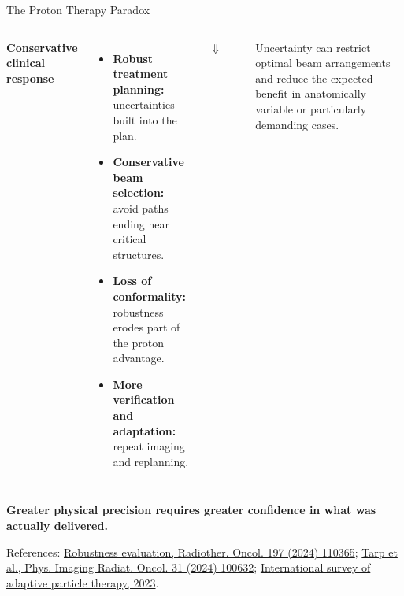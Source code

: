 \documentclass[aspectratio=169,11pt]{beamer}
\begin{document}
\begin{frame}{The Proton Therapy Paradox}
\begin{columns}[T,onlytextwidth]
{\normalsize\bfseries\color{PTblue}
Conservative clinical response
}

\vspace{0.30cm}

{\tiny
\begin{itemize}
    \item \textbf{Robust treatment planning:} uncertainties built into the plan.
    \item \textbf{Conservative beam selection:} avoid paths ending near critical structures.
    \item \textbf{Loss of conformality:} robustness erodes part of the proton advantage.
    \item \textbf{More verification and adaptation:} repeat imaging and replanning.
\end{itemize}
}
{\large\color{crGrey}$\Downarrow$\par}
\vspace{0.08cm}
{\scriptsize\bfseries\color{crBlue}\raggedright\setlength{\baselineskip}{0.85\baselineskip}
Uncertainty can restrict optimal beam arrangements and reduce the expected benefit in anatomically variable or particularly demanding cases.\par}

\end{columns}

\vfill

\begin{center}
{\footnotesize\bfseries\color{darkred}
Greater physical precision requires greater confidence in what was actually delivered.
}
\end{center}

\vspace{0.08cm}

{\tiny\color{PTgray}
References:
\href{https://doi.org/10.1016/j.radonc.2024.110365}
{Robustness evaluation, Radiother. Oncol. 197 (2024) 110365};
\href{https://doi.org/10.1016/j.phro.2024.100632}
{Tarp et al., Phys. Imaging Radiat. Oncol. 31 (2024) 100632};
\href{https://doi.org/10.1016/j.phro.2023.100412}
{International survey of adaptive particle therapy, 2023}.
}

\end{frame}
\end{document}
